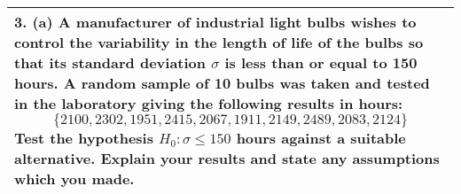 \documentclass[a4paper,12pt]{article}
\begin{document}
\begin{table}[ht!]
 
\centering
 
\begin{tabular}{|p{15cm}|}
 
\hline  

3. (a) A manufacturer of industrial light bulbs wishes to control the variability in the length of life of the bulbs so that its standard deviation $\sigma$ is less than or equal to 150 hours.  A random sample of 10 bulbs was taken and tested in the laboratory giving the following results in hours:
\[\{2100,  2302,  1951,  2415,  2067,  1911,  2149,  2489,  2083,  2124\}\]
Test the hypothesis $H_0: \sigma \leq 150$ hours against a suitable alternative.  Explain your results and state any assumptions which you made.

\\ \hline
  
\end{tabular}

\end{table}
\end{document}
